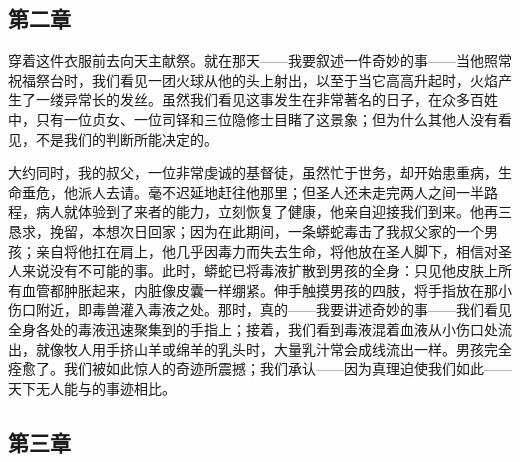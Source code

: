\subsection{第二章}

穿着这件衣服前去向天主献祭。就在那天——我要叙述一件奇妙的事——当他照常祝福祭台时，我们看见一团火球从他的头上射出，以至于当它高高升起时，火焰产生了一缕异常长的发丝。虽然我们看见这事发生在非常著名的日子，在众多百姓中，只有一位贞女、一位司铎和三位隐修士目睹了这景象；但为什么其他人没有看见，不是我们的判断所能决定的。\par

大约同时，我的叔父，一位非常虔诚的基督徒，虽然忙于世务，却开始患重病，生命垂危，他派人去请。毫不迟延地赶往他那里；但圣人还未走完两人之间一半路程，病人就体验到了来者的能力，立刻恢复了健康，他亲自迎接我们到来。他再三恳求，挽留，本想次日回家；因为在此期间，一条蟒蛇毒击了我叔父家的一个男孩；亲自将他扛在肩上，他几乎因毒力而失去生命，将他放在圣人脚下，相信对圣人来说没有不可能的事。此时，蟒蛇已将毒液扩散到男孩的全身：只见他皮肤上所有血管都肿胀起来，内脏像皮囊一样绷紧。伸手触摸男孩的四肢，将手指放在那小伤口附近，即毒兽灌入毒液之处。那时，真的——我要讲述奇妙的事——我们看见全身各处的毒液迅速聚集到的手指上；接着，我们看到毒液混着血液从小伤口处流出，就像牧人用手挤山羊或绵羊的乳头时，大量乳汁常会成线流出一样。男孩完全痊愈了。我们被如此惊人的奇迹所震撼；我们承认——因为真理迫使我们如此——天下无人能与的事迹相比。\par


\subsection{第三章}

